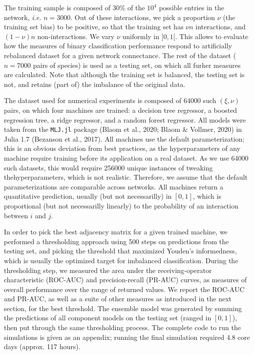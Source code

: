 \documentclass[11pt]{article}
\begin{document}
The training sample is composed of 30\% of the \(10^4\) possible entries
in the network, \emph{i.e.} \(n=3000\). Out of these interactions, we
pick a proportion \(\nu\) (the training set bias) to be positive, so
that the training set has \(\nu n\) interactions, and \((1-\nu) n\)
non-interactions. We vary \(\nu\) uniformly in \(]0,1[\). This allows to
evaluate how the measures of binary classification performance respond
to artificially rebalanced dataset for a given network connectance. The
rest of the dataset (\(n=7000\) pairs of species) is used as a testing
set, on which all furher measures are calculated. Note that although the
training set is balanced, the testing set is not, and retains (part of)
the imbalance of the original data.

The dataset used for numerical experiments is composed of 64000 such
\((\xi, \nu)\) pairs, on which four machines are trained: a decision
tree regressor, a boosted regression tree, a ridge regressor, and a
random forest regressor. All models were taken from the \texttt{MLJ.jl}
package (Blaom et al., 2020; Blaom \& Vollmer, 2020) in Julia 1.7
(Bezanson et al., 2017). All machines use the default parameterization;
this is an obvious deviation from best practices, as the hyperparameters
of any machine require training before its application on a real
dataset. As we use 64000 such datasets, this would require 256000 unique
instances of tweaking thehyperparameters, which is not realistic.
Therefore, we assume that the default parameterizations are comparable
across networks. All machines return a quantitative prediction, usually
(but not necessarilly) in \([0,1]\), which is proportional (but not
necessarilly linearly) to the probability of an interaction between
\(i\) and \(j\).

In order to pick the best adjacency matrix for a given trained machine,
we performed a thresholding approach using 500 steps on predictions from
the testing set, and picking the threshold that maximized Youden's
informedness, which is usually the optimized target for imbalanced
classification. During the thresholding step, we measured the area under
the receiving-operator characteristic (ROC-AUC) and precision-recall
(PR-AUC) curves, as measures of overall performance over the range of
returned values. We report the ROC-AUC and PR-AUC, as well as a suite of
other measures as introduced in the next section, for the best
threshold. The ensemble model was generated by summing the predictions
of all component models on the testing set (ranged in \([0,1]\)), then
put through the same thresholding process. The complete code to run the
simulations is given as an appendix; running the final simulation
required 4.8 core days (approx. 117 hours).
\end{document}
